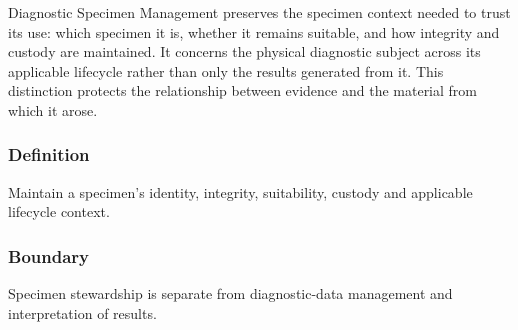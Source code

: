 Diagnostic Specimen Management preserves the specimen context needed to trust its use: which specimen it is, whether it remains suitable, and how integrity and custody are maintained. It concerns the physical diagnostic subject across its applicable lifecycle rather than only the results generated from it. This distinction protects the relationship between evidence and the material from which it arose.

\subsubsection*{Definition}

Maintain a specimen’s identity, integrity, suitability, custody and applicable lifecycle context.

\subsubsection*{Boundary}

Specimen stewardship is separate from diagnostic-data management and interpretation of results.

